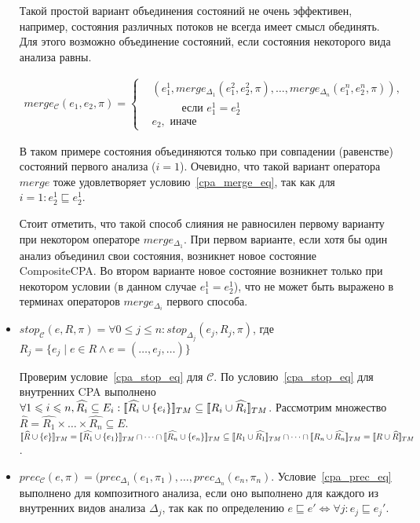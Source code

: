 \begin{itemize}
Такой простой вариант объединения состояний не очень эффективен, например, состояния различных потоков не всегда имеет смысл обединять.
Для этого возможно объединение состояний, если состояния некоторого вида анализа равны. 

\begin{align*}
merge_{\mathscr{C}}(e_1,e_2,\pi) =
\begin{cases}
&(e_1^1, merge_{\Delta_1}(e_1^2, e_2^2,\pi), \dots, merge_{\Delta_n}(e_1^n, e_2^n,\pi)), \\
& \hspace{1cm} \mbox{ если } e_1^1 = e_2^1 \\
& e_2, \mbox{ иначе }
\end{cases} 
\end{align*}

В таком примере состояния объединяются только при совпадении (равенстве) состояний первого анализа ($i=1$).
Очевидно, что такой вариант оператора $merge$ тоже удовлетворяет условию~\ref{cpa_merge_eq}, так как для $i = 1: e_2^1 \sqsubseteq e_2^1$.

Стоит отметить, что такой способ слияния не равносилен первому варианту при некотором операторе $merge_{\Delta_1}$.
При первом варианте, если хотя бы один анализ объединил свои состояния, возникнет новое состояние CompositeCPA. 
Во втором варианте новое состояние возникнет только при некотором условии (в данном случае $e_1^1 = e_2^1$), что не может быть выражено в терминах операторов $merge_{\Delta_i}$ первого способа.

\item 
$stop_{\mathscr{C}}(e,R,\pi)=\forall 0 \le j \le n: stop_{\Delta_j}(e_j, R_j, \pi)$, где $R_j = \{e_j \mid e \in R \land e = (\dots, e_j, \dots)\}$

Проверим условие~\ref{cpa_stop_eq} для $\mathscr{C}$.
По условию~\ref{cpa_stop_eq} для внутренних CPA выполнено $\forall 1 \leqslant i \leqslant n, \widehat{R_i} \subseteq E_i: [\![ \widehat{R_i} \cup \{e_i\} ]\!]_{TM} \subseteq [\![ R_i \cup \widehat{R_i} ]\!]_{TM}$.
Рассмотрим множество $\widehat{R} = \widehat{R_1} \times \dots \times \widehat{R_n} \subseteq E$. 
$\conc{\widehat{R} \cup \{e\}}_{TM} = \conc{\widehat{R_1} \cup \{e_1\}}_{TM} \cap \dots \cap \conc{\widehat{R_n} \cup \{e_n\}}_{TM} \subseteq \conc{R_1 \cup \widehat{R_1}}_{TM} \cap \dots \cap \conc{R_n \cup \widehat{R_n}}_{TM} = \conc{R \cup \widehat{R}}_{TM}$.

\item 
$prec_{\mathscr{C}}(e,\pi)=(prec_{\Delta_1}(e_1, \pi_1), \dots, prec_{\Delta_n}(e_n, \pi_n)$. Условие~\ref{cpa_prec_eq} выполнено для композитного анализа, если оно выполнено для каждого из внутренних видов анализа $\Delta_j$, так как по определению $e \sqsubseteq e' \iff \forall j: e_j \sqsubseteq e_j'$.


\end{itemize}
